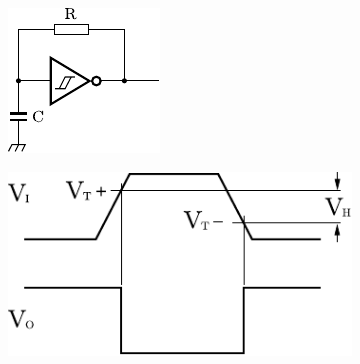\documentclass[11pt,a4paper,oneside]{article}
\begin{document}
\begin{figure}[H]
  \begin{subfigure}[b]{0.2\textwidth}
    \centering
    \includegraphics[width=\textwidth]{images/schmitt_trigger_circuito}
    \label{fig:schmitt-circuito}
  \end{subfigure}
  \hfill
  \begin{subfigure}[b]{0.35\textwidth}
    \centering
    \includegraphics[width=\textwidth]{images/schmitt_trigger_tiempo}
    \label{fig:schmitt-tiempo}
  \end{subfigure}  
  \hfill
  \begin{subfigure}[b]{0.25\textwidth}
    \centering

\end{subfigure}
\end{figure}
\end{document}
